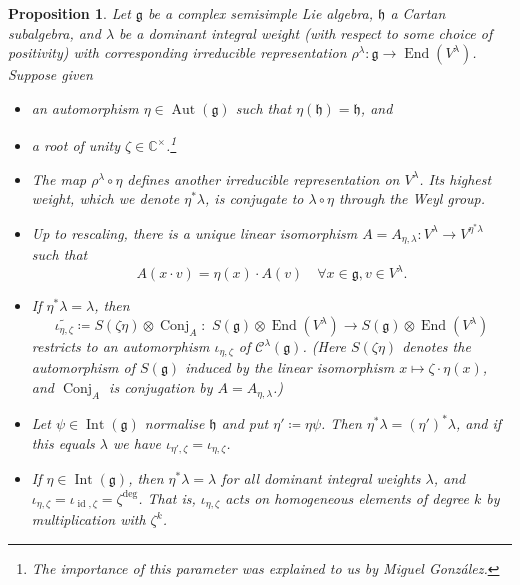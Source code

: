 \documentclass{amsart}
\newcommand{\Aut}{\operatorname{Aut}}
\newcommand{\C}{\mathbb{C}}
\newcommand{\Conj}{\operatorname{Conj}}
\newcommand{\Kir}{\mathcal{C}}
\newcommand{\End}{\operatorname{End}}
\newcommand{\g}{\mathfrak{g}}
\newcommand{\h}{\mathfrak{h}}
\newcommand{\id}{\operatorname{id}}
\newcommand{\Int}{\operatorname{Int}}
\theoremstyle{definition}
\theoremstyle{plain}
\newtheorem{prop}[defn]{Proposition}
\theoremstyle{remark}
\begin{document}
\begin{prop}
\label{prop:iota_eta_zeta}
    Let $\g$ be a complex semisimple Lie algebra, $\h$ a Cartan subalgebra, and $\lambda$ be a dominant integral weight (with respect to some choice of positivity) with corresponding irreducible representation $\rho^\lambda \colon \g\to \End(V^\lambda)$. Suppose given
    \begin{itemize}
        \item an automorphism $\eta\in \Aut(\g)$ such that $\eta(\h)=\h$, and
        \item a root of unity $\zeta\in \C^\times$.\footnote{The importance of this parameter was explained to us by Miguel González.}
    \end{itemize}
    \begin{itemize}
        \item[(i)] The map $\rho^\lambda\circ \eta$ defines another irreducible representation on $V^\lambda$. Its highest weight, which we denote $\eta^*\lambda$, is conjugate to $\lambda\circ \eta$ through the Weyl group.
        \item[(ii)] Up to rescaling, there is a unique linear isomorphism $A = A_{\eta,\lambda} \colon V^\lambda \to V^{\eta^*\lambda}$ such that
        $$
            A(x\cdot v) = \eta(x) \cdot A(v)
            \quad
            \forall x\in \g, v\in V^\lambda.
        $$
        \item[(iii)] If $\eta^*\lambda = \lambda$, then 
        $$
            \widetilde{\iota_{\eta, \zeta}}
            \coloneqq S (\zeta\eta) \otimes \Conj_{A}
            \colon\,\,
            S(\g) \otimes \End(V^\lambda) \to S(\g) \otimes \End(V^\lambda)
        $$
        restricts to an automorphism $\iota_{\eta,\zeta}$ of $\Kir^\lambda(\g)$. (Here $S(\zeta\eta)$ denotes the automorphism of $S(\g)$ induced by the linear isomorphism $x\mapsto \zeta\cdot\eta(x)$, and $\Conj_A$ is conjugation by $A=A_{\eta,\lambda}$.)
        \item[(iv)] Let $\psi \in \Int(\g)$ normalise $\h$ and put $\eta'\coloneqq \eta\psi$. Then $\eta^*\lambda = (\eta')^*\lambda$, and if this equals $\lambda$ we have $\iota_{\eta',\zeta} = \iota_{\eta, \zeta}$.
        \item[(v)] If $\eta\in \Int(\g)$, then $\eta^*\lambda = \lambda$ for all dominant integral weights $\lambda$, and $\iota_{\eta,\zeta} = \iota_{\id,\zeta} = \zeta^{\deg}$. That is, $\iota_{\eta,\zeta}$ acts on homogeneous elements of degree $k$ by multiplication with $\zeta^k$.
    \end{itemize}
\end{prop}
\end{document}
